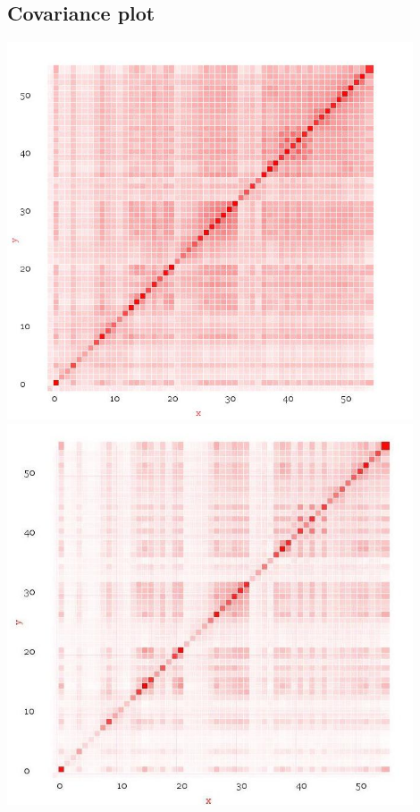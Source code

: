 \documentclass[10pt]{article}
\begin{document}
\subsection{Covariance plot}
\includegraphics[width=120mm]{ReportMedia/CovariancePre.jpg}\\
\includegraphics[width=120mm]{ReportMedia/CovariancePost.jpg}
\newpage
\end{document}
